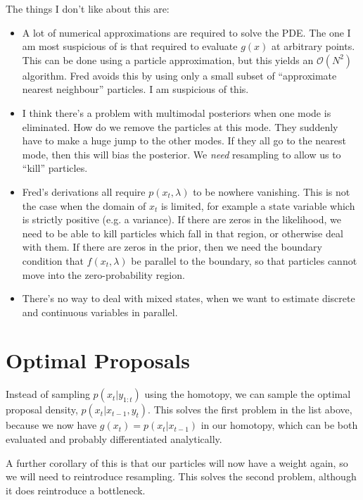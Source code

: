 \documentclass{article}
\begin{document}
The things I don't like about this are:
\begin{itemize}
  \item A lot of numerical approximations are required to solve the PDE. The one I am most suspicious of is that required to evaluate $g(x)$ at arbitrary points. This can be done using a particle approximation, but this yields an $\mathcal{O}(N^2)$ algorithm. Fred avoids this by using only a small subset of ``approximate nearest neighbour'' particles. I am suspicious of this.
  \item I think there's a problem with multimodal posteriors when one mode is eliminated. How do we remove the particles at this mode. They suddenly have to make a huge jump to the other modes. If they all go to the nearest mode, then this will bias the posterior. We \emph{need} resampling to allow us to ``kill'' particles.
  \item Fred's derivations all require $p(x_t,\lambda)$ to be nowhere vanishing. This is not the case when the domain of $x_t$ is limited, for example a state variable which is strictly positive (e.g. a variance). If there are zeros in the likelihood, we need to be able to kill particles which fall in that region, or otherwise deal with them. If there are zeros in the prior, then we need the boundary condition that $f(x_t, \lambda)$ be parallel to the boundary, so that particles cannot move into the zero-probability region.
  \item There's no way to deal with mixed states, when we want to estimate discrete and continuous variables in parallel.
\end{itemize}



\section{Optimal Proposals}

Instead of sampling $p(x_t | y_{1:t})$ using the homotopy, we can sample the optimal proposal density, $p(x_t | x_{t-1}, y_t)$. This solves the first problem in the list above, because we now have $g(x_t)=p(x_t|x_{t-1})$ in our homotopy, which can be both evaluated and probably differentiated analytically.

A further corollary of this is that our particles will now have a weight again, so we will need to reintroduce resampling. This solves the second problem, although it does reintroduce a bottleneck.
\end{document}
